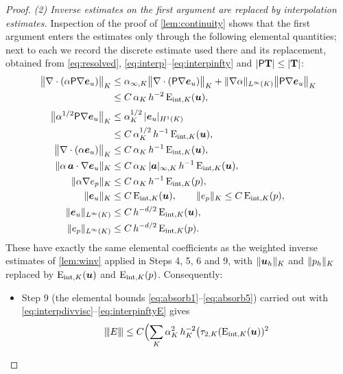 \begin{proof}
\smallskip\noindent\emph{(2) Inverse estimates on the first argument are replaced by
interpolation estimates.}
Inspection of the proof of \cref{lem:continuity} shows that the first argument enters the
estimates only through the following elemental quantities; next to each we record the
discrete estimate used there and its replacement, obtained from \eqref{eq:resolved},
\eqref{eq:interp}--\eqref{eq:interpinfty} and
$|\mathsf{P}\mathbf{T}|\le|\mathbf{T}|$:
\begin{align}
  \bigl\lVert\nabla\cdot(\alpha\mathsf{P}\nabla\boldsymbol{e}_{u})\bigr\rVert_K
  &\le \alpha_{\infty,K}\bigl\lVert\nabla\cdot(\mathsf{P}\nabla\boldsymbol{e}_{u})\bigr\rVert_K
   + \lVert\nabla\alpha\rVert_{L^\infty(K)}\bigl\lVert\mathsf{P}\nabla\boldsymbol{e}_{u}\bigr\rVert_K \\
  &\le C\,\alpha_K\,h^{-2}\,\mathrm{E}_{\mathrm{int},K}(\boldsymbol{u}),
  \label{eq:interpdivvisc}\\[2pt]
  \bigl\lVert\alpha^{1/2}\mathsf{P}\nabla\boldsymbol{e}_{u}\bigr\rVert_K
  &\le \alpha_K^{1/2}\,|\boldsymbol{e}_{u}|_{H^1(K)} \\
  &\le C\,\alpha_K^{1/2}\,h^{-1}\,\mathrm{E}_{\mathrm{int},K}(\boldsymbol{u}),
  \label{eq:interpgrad}\\
  \bigl\lVert\nabla\cdot(\alpha\boldsymbol{e}_{u})\bigr\rVert_K
  &\le C\,\alpha_K\,h^{-1}\,\mathrm{E}_{\mathrm{int},K}(\boldsymbol{u}), \\
   \lVert\alpha\,\boldsymbol{a}\cdot\nabla\boldsymbol{e}_{u}\rVert_K
   &\le C\,\alpha_K\,|\boldsymbol{a}|_{\infty,K}\,h^{-1}\,\mathrm{E}_{\mathrm{int},K}(\boldsymbol{u}),
  \label{eq:interpfirst}\\
  \lVert\alpha\nabla e_p\rVert_K
  &\le C\,\alpha_K\,h^{-1}\,\mathrm{E}_{\mathrm{int},K}(p), \\
   \lVert\boldsymbol{e}_{u}\rVert_K &\le C\,\mathrm{E}_{\mathrm{int},K}(\boldsymbol{u}),
  \qquad
   \lVert e_p\rVert_K \le C\,\mathrm{E}_{\mathrm{int},K}(p),
  \label{eq:interpzero}\\
  \lVert\boldsymbol{e}_{u}\rVert_{L^\infty(K)}
  &\le C\,h^{-d/2}\,\mathrm{E}_{\mathrm{int},K}(\boldsymbol{u}), \\
  \lVert e_p\rVert_{L^\infty(K)} &\le C\,h^{-d/2}\,\mathrm{E}_{\mathrm{int},K}(p).
  \label{eq:interpinftyE}
\end{align}
These have exactly the same elemental coefficients as the weighted inverse estimates of
\cref{lem:winv} applied in Steps 4, 5, 6 and 9, with $\lVert\boldsymbol{u}_h\rVert_K$ and $\lVert p_h\rVert_K$
replaced by $\mathrm{E}_{\mathrm{int},K}(\boldsymbol{u})$ and $\mathrm{E}_{\mathrm{int},K}(p)$. Consequently:
\begin{itemize}[leftmargin=2em]
\item Step 9 (the elemental bounds \eqref{eq:absorb1}--\eqref{eq:absorb5}) carried out
with \eqref{eq:interpdivvisc}--\eqref{eq:interpinftyE} gives
\begin{equation}\label{eq:Enorm}
  \triplenorm{E}
  \le C\Bigl(\sum_{K}\alpha_K^2\,h_K^{-2}\bigl(\tau_{2,K}(\Eint{K}{\bu})^2

\end{equation}
\end{itemize}
\end{proof}
